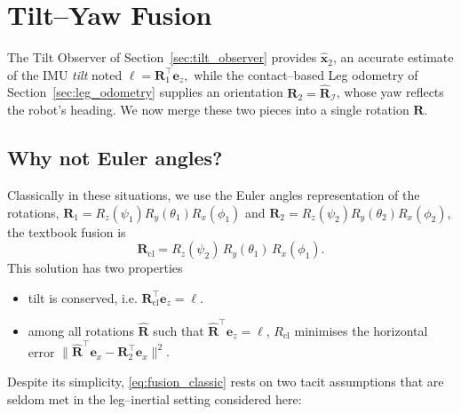 \documentclass{IJCAS}
\begin{document}
\section{Tilt--Yaw Fusion}
\label{sec:axisAgnostic}

The Tilt Observer of Section~\ref{sec:tilt_observer} provides $\hat{\boldsymbol{x}}_{2}$,  an accurate
estimate of the IMU \emph{tilt} noted
\(
  \boldsymbol{\ell}=\boldsymbol{R}_{1}^{\top}\boldsymbol{e}_{z},
\)
while the contact–based Leg odometry of
Section~\ref{sec:leg_odometry} supplies an orientation \(\boldsymbol{R}_{2} = \hat{\boldsymbol{R}}_{\mathcal{I}}\), whose
yaw reflects the robot's heading.  We now merge these two pieces into a
single rotation \(\boldsymbol{R}\).

\subsection{Why not Euler angles?}

Classically in these situations, we use the Euler angles representation of the rotations,
\(\boldsymbol{R}_{1}=R_{z}(\psi_{1})R_{y}(\theta_{1})R_{x}(\phi_{1})\) and
\(\boldsymbol{R}_{2}=R_{z}(\psi_{2})R_{y}(\theta_{2})R_{x}(\phi_{2})\),
the textbook fusion is
\begin{equation}
  \boldsymbol{R}_{\mathrm{cl}}
  =R_{z}(\psi_{2})\,R_{y}(\theta_{1})\,R_{x}(\phi_{1}).
  \label{eq:fusion_classic}
\end{equation}
This solution has two properties
\begin{itemize}
\item tilt is conserved, i.e. 
\(\boldsymbol{R}_{\mathrm{cl}}^{\top}\boldsymbol{e}_{z}=\boldsymbol{\ell}\).
\item among all rotations \(\hat{\boldsymbol{R}}\) such that
\(\hat{\boldsymbol{R}}^{\top}\boldsymbol{e}_{z}=\boldsymbol{\ell}\),
\(R_{\mathrm{cl}}\) minimises the horizontal error
\(
  \|
    \hat{\boldsymbol{R}}^{\top}\boldsymbol{e}_{x}-\boldsymbol{R}_{2}^{\top}\boldsymbol{e}_{x}
  \|^{2}.
\)
\end{itemize}


Despite its simplicity, \eqref{eq:fusion_classic} rests on two tacit
assumptions that are seldom met in the leg–inertial setting considered
here:
\end{document}
